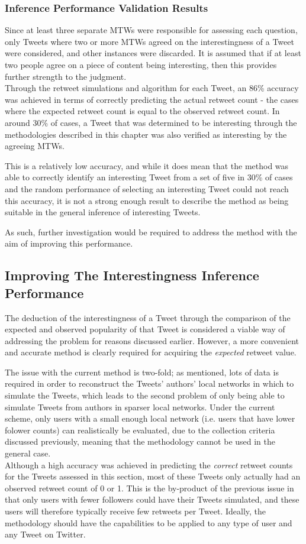 \subsubsection{Inference Performance Validation Results}
Since at least three separate MTWs were responsible for assessing each question, only Tweets where two or more MTWs agreed on the interestingness of a Tweet were considered, and other instances were discarded. It is assumed that if at least two people agree on a piece of content being interesting, then this provides further strength to the judgment.\\
Through the retweet simulations and algorithm for each Tweet, an 86\% accuracy was achieved in terms of correctly predicting the actual retweet count - the cases where the expected retweet count is equal to the observed retweet count. In around 30\% of cases, a Tweet that was determined to be interesting through the methodologies described in this chapter was also verified as interesting by the agreeing MTWs.

This is a relatively low accuracy, and while it does mean that the method was able to correctly identify an interesting Tweet from a set of five in 30\% of cases and the random performance of selecting an interesting Tweet could not reach this accuracy, it is not a strong enough result to describe the method as being suitable in the general inference of interesting Tweets. 

As such, further investigation would be required to address the method with the aim of improving this performance.


\subsection{Improving The Interestingness Inference Performance}
The deduction of the interestingness of a Tweet through the comparison of the expected and observed popularity of that Tweet is considered a viable way of addressing the problem for reasons discussed earlier. However, a more convenient and accurate method is clearly required for acquiring the \textit{expected} retweet value.

The issue with the current method is two-fold; as mentioned, lots of data is required in order to reconstruct the Tweets' authors' local networks in which to simulate the Tweets, which leads to the second problem of only being able to simulate Tweets from authors in sparser local networks. Under the current scheme, only users with a small enough local network (i.e. users that have lower folower counts) can realistically be evaluated, due to the collection criteria discussed previously, meaning that the methodology cannot be used in the general case.\\
Although a high accuracy was achieved in predicting the \textit{correct} retweet counts for the Tweets assessed in this section, most of these Tweets only actually had an observed retweet count of 0 or 1. This is the by-product of the previous issue in that only users with fewer followers could have their Tweets simulated, and these users will therefore typically receive few retweets per Tweet. Ideally, the methodology should have the capabilities to be applied to any type of user and any Tweet on Twitter.

